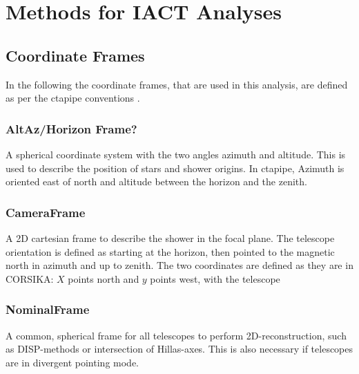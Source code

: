 \chapter{Methods for IACT Analyses}

\section{Coordinate Frames}
In the following the coordinate frames, that are used in this analysis,
are defined as per the ctapipe conventions \cite{karl_kosack_2019_3372211}.

\subsection{AltAz/Horizon Frame?}
A spherical coordinate system with the two angles azimuth and altitude.
This is used to describe the position of stars and shower origins.
In ctapipe, Azimuth is oriented east of north and altitude between the horizon 
and the zenith.

\subsection{CameraFrame}
A 2D cartesian frame to describe the shower in the focal plane.
The telescope orientation is defined as 
starting at the horizon, then pointed to the 
magnetic north in azimuth and up to zenith.
The two coordinates are defined as they are in CORSIKA:
$X$ points north and $y$ points west, with the telescope


\subsection{NominalFrame}
A common, spherical frame for all telescopes to perform 2D-reconstruction,
such as DISP-methods or intersection of Hillas-axes.
This is also necessary if telescopes are in divergent pointing mode.




